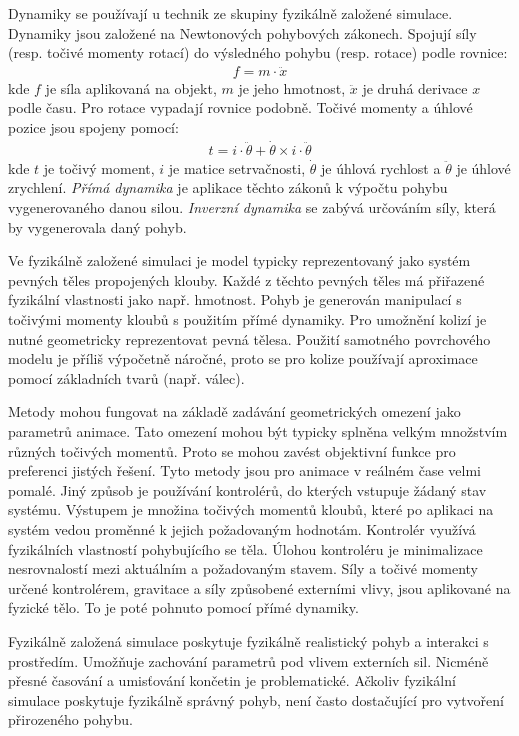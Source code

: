 Dynamiky se používají u technik ze skupiny fyzikálně založené simulace. Dynamiky jsou založené na Newtonových pohybových zákonech. Spojují síly (resp. točivé momenty rotací) do výsledného pohybu (resp. rotace) podle rovnice: 
\begin{eqnarray}
f=m \cdot \ddot{x}\label{r.dynamics1}
\end{eqnarray}
kde $f$ je síla aplikovaná na objekt, $m$ je jeho hmotnost, $\ddot{x}$ je druhá derivace $x$ podle času. Pro rotace vypadají rovnice podobně. Točivé momenty a úhlové pozice jsou spojeny pomocí:
\begin{eqnarray}
t=i \cdot \ddot{\theta} + \dot{\theta} \times i \cdot \ddot{\theta}\label{r.dynamics2}
\end{eqnarray} 
kde $t$ je točivý moment, $i$ je matice setrvačnosti, $\dot{\theta}$ je úhlová rychlost a $\ddot{\theta}$ je úhlové zrychlení. \textit{Přímá dynamika} je aplikace těchto zákonů k výpočtu pohybu vygenerovaného danou silou. \textit{Inverzní dynamika} se zabývá určováním síly, která by vygenerovala daný pohyb.

Ve fyzikálně založené simulaci je model typicky reprezentovaný jako systém pevných těles propojených klouby. Každé z těchto pevných těles má přiřazené fyzikální vlastnosti jako např. hmotnost. Pohyb je generován manipulací s točivými momenty kloubů s použitím přímé dynamiky. Pro umožnění kolizí je nutné geometricky reprezentovat pevná tělesa. Použití samotného povrchového modelu je příliš výpočetně náročné, proto se pro kolize používají aproximace pomocí základních tvarů (např. válec).

Metody mohou fungovat na základě zadávání geometrických omezení jako parametrů animace. Tato omezení mohou být typicky splněna velkým množstvím různých točivých momentů. Proto se mohou zavést objektivní funkce pro preferenci jistých řešení. Tyto metody jsou pro animace v reálném čase velmi pomalé. Jiný způsob je používání kontrolérů, do kterých vstupuje žádaný stav systému. Výstupem je množina točivých momentů kloubů, které po aplikaci na systém vedou proměnné k jejich požadovaným hodnotám. Kontrolér využívá fyzikálních vlastností pohybujícího se těla. Úlohou kontroléru je minimalizace nesrovnalostí mezi aktuálním a požadovaným stavem. Síly a točivé momenty určené kontrolérem, gravitace a síly způsobené externími vlivy, jsou aplikované na fyzické tělo. To je poté pohnuto pomocí přímé dynamiky. 

Fyzikálně založená simulace poskytuje fyzikálně realistický pohyb a interakci s prostředím. Umožňuje zachování parametrů pod vlivem externích sil. Nicméně přesné časování a umisťování končetin je problematické. Ačkoliv fyzikální simulace poskytuje fyzikálně správný pohyb, není často dostačující pro vytvoření přirozeného pohybu. 

